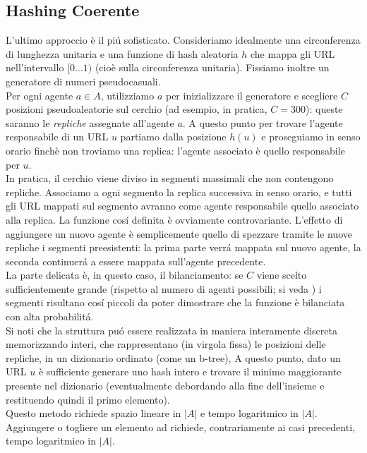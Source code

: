 \subsection{Hashing Coerente}
L'ultimo approccio è il piú sofisticato. Consideriamo idealmente una circonferenza di lunghezza unitaria e una funzione di hash aleatoria $h$ che mappa gli URL nell'intervallo $[0\dots1)$ (cioè sulla circonferenza unitaria). Fissiamo inoltre un generatore di numeri pseudocasuali.\\
Per ogni agente $a \in A$, utilizziamo $a$ per inizializzare il generatore e scegliere $C$ posizioni pseudoaleatorie sul cerchio (ad esempio, in pratica, $C = 300$): queste saranno le \textit{repliche} assegnate all'agente $a$. A questo punto per trovare l'agente responsabile di un URL $u$ partiamo dalla posizione $h(u)$ e proseguiamo in senso orario finchè non troviamo una replica: l'agente associato è quello responsabile per $u$.\\
In pratica, il cerchio viene diviso in segmenti massimali che non contengono repliche. Associamo a ogni segmento la replica successiva in senso orario, e tutti gli URL mappati sul segmento avranno come agente responsabile quello associato alla replica. La funzione cosí definita è ovviamente controvariante. L'effetto di aggiungere un nuovo agente è semplicemente quello di spezzare tramite le nuove repliche i segmenti preesistenti: la prima parte verrá mappata sul nuovo agente, la seconda continuerá a essere mappata sull'agente precedente.\\
La parte delicata è, in questo caso, il bilanciamento: se $C$ viene scelto sufficientemente grande (rispetto al numero di agenti possibili; si veda %
) i segmenti risultano cosí piccoli da poter dimostrare che la funzione è bilanciata con alta probabilitá.\\
Si noti che la struttura puó essere realizzata in maniera interamente discreta memorizzando interi, che rappresentano (in virgola fissa) le posizioni delle repliche, in un dizionario ordinato (come un b-tree), A questo punto, dato un URL $u$ è sufficiente generare uno hash intero e trovare il minimo maggiorante presente nel dizionario (eventualmente debordando alla fine dell'insieme e restituendo quindi il primo elemento).\\
Questo metodo richiede spazio lineare in $|A|$ e tempo logaritmico in $|A|$. Aggiungere o togliere un elemento ad  richiede, contrariamente ai casi precedenti, tempo logaritmico in $|A|$.
